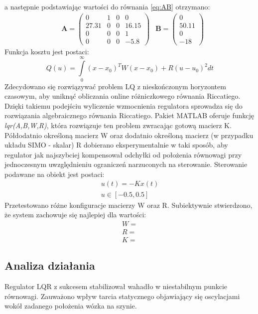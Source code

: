a następnie podstawiając wartości do równania \ref{eq:AB} otrzymano:
\begin{equation}
\label{eq:ABwar}
\begin{aligned}
&\mathbf{A} =
\left( \begin{array}{cccc}
0 & 1 & 0 & 0 \\
27.31 & 0 & 0 & 16.15 \\
0 & 0 & 0 & 1 \\
0 & 0 & 0 & -5.8
\end{array} \right)
&\mathbf{B} =
\left( \begin{array}{cccc}
0 \\
50.11 \\
0 \\
-18
\end{array} \right)
\end{aligned}
\end{equation}
Funkcja kosztu jest postaci:
\begin{equation}
Q(u) = \int\limits_{0}^{\infty}  \left( x-x_{0}\right)^TW\left( x-x_{0}\right) + R\left( u-u_{0}\right)^2  dt
\label{eq:cost}  
\end{equation}
Zdecydowano się rozwiązywać problem LQ z nieskończonym horyzontem czasowym, aby uniknąć obliczania online różniczkowego równania Riccatiego. Dzięki takiemu podejściu wyliczenie wzmocnienia regulatora sprowadza się do rozwiązania algebraicznego równania Riccatiego. Pakiet MATLAB oferuje funkcję \textit{lqr(A,B,W,R)}, która rozwiązuje ten problem zwracając gotową macierz K. Półdodatnio określoną macierz W oraz dodatnio określoną macierz (w przypadku układu SIMO - skalar) R dobierano eksperymentalnie w taki sposób, aby regulator jak najszybciej kompensował odchyłki od położenia równowagi przy jednoczesnym uwzględnieniu ograniczeń narzuconych na sterowanie. Sterowanie podawane na obiekt jest postaci:
\begin{eqnarray}
\label{eq:u}
u(t) = -Kx(t)\\
u\in[-0.5, 0.5]    
\end{eqnarray}
Przetestowano różne konfiguracje macierzy W oraz R. Subiektywnie stwierdzono, że system zachowuje się najlepiej dla wartości:
\begin{eqnarray}
W = \\
R = \\
K =   
\end{eqnarray}
\subsection{Analiza działania}
Regulator LQR z sukcesem stabilizował wahadło w niestabilnym punkcie równowagi.
Zauważono wpływ tarcia statycznego objawiający się oscylacjami wokół zadanego położenia wózka na szynie.
